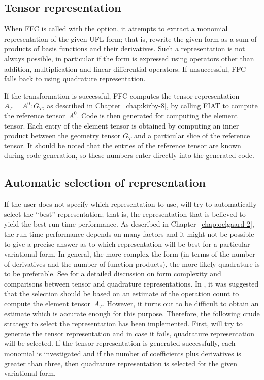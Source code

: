 \subsection{Tensor representation}

When FFC is called with the  option,
it attempts to extract a monomial representation of the given UFL
form; that is, rewrite the given form as a sum of products of basis
functions and their derivatives. Such a representation is not always
possible, in particular if the form is expressed using operators other
than addition, multiplication and linear differential operators. If
unsuccessful, FFC falls back to using quadrature representation.

If the transformation is successful, FFC computes the tensor
representation $A_T = A^0 : G_T$, as described in Chapter~\ref{chap:kirby-8},
by calling FIAT to compute the reference tensor~$A^0$. Code is then
generated for computing the element tensor. Each entry of the element
tensor is obtained by computing an inner product between the geometry
tensor $G_T$ and a particular slice of the reference tensor. It should
be noted that the entries of the reference tensor are known during
code generation, so these numbers enter directly into the generated
code.

\subsection{Automatic selection of representation}

If the user does not specify which representation to use, \ffc{} will
try to automatically select the ``best'' representation; that is, the
representation that is believed to yield the best run-time
performance. As described in Chapter~\ref{chap:oelgaard-2}, the
run-time performance depends on many factors and it might not be
possible to give a precise \apriori{} answer as to which
representation will be best for a particular variational form. In
general, the more complex the form (in terms of the number of
derivatives and the number of function products), the more likely
quadrature is to be preferable. See \citet{OelgaardWells2010} for a
detailed discussion on form complexity and comparisons between tensor
and quadrature representations. In \citet{OelgaardWells2010}, it was
suggested that the selection should be based on an estimate of the
operation count to compute the element tensor~$A_T$.  However, it
turns out to be difficult to obtain an estimate which is accurate
enough for this purpose. Therefore, the following crude strategy to
select the representation has been implemented. First, \ffc{} will try
to generate the tensor representation and in case it fails, quadrature
representation will be selected. If the tensor representation is
generated successfully, each monomial is investigated and if the
number of coefficients plus derivatives is greater than three, then
quadrature representation is selected for the given variational form.

